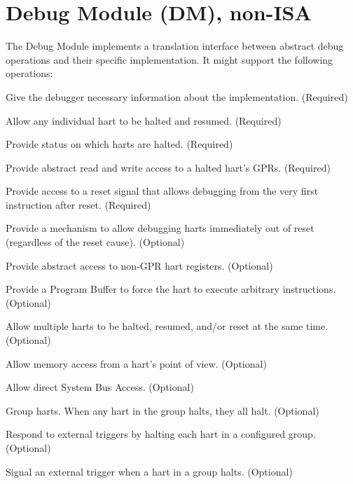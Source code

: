 \chapter{Debug Module (DM), non-ISA} \label{chap:dm}

\begin{steps}{The Debug Module implements a translation interface between abstract debug
    operations and their specific implementation. It might support the following
    operations:}
\item Give the debugger necessary information about the implementation. (Required)
\item Allow any individual hart to be halted and resumed. (Required)
\item Provide status on which harts are halted. (Required)
\item Provide abstract read and write access to a halted hart's GPRs. (Required)
\item Provide access to a reset signal that allows debugging from the very
    first instruction after reset. (Required)
\item Provide a mechanism to allow debugging harts immediately out of reset
      (regardless of the reset cause). (Optional)
\item Provide abstract access to non-GPR hart registers. (Optional)
\item Provide a Program Buffer to force the hart to execute arbitrary instructions. (Optional)
\item Allow multiple harts to be halted, resumed, and/or reset at the same time. (Optional)
\item Allow memory access from a hart's point of view. (Optional)
\item Allow direct System Bus Access. (Optional)
\item Group harts. When any hart in the group halts, they all halt. (Optional)
\item Respond to external triggers by halting each hart in a configured group. (Optional)
\item Signal an external trigger when a hart in a group halts. (Optional)
\end{steps}

